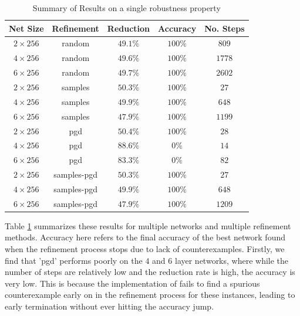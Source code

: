 \begin{table}
\begin{tabular}{|c|c|c|c|c|}
    \hline
    Net Size     & Refinement  & Reduction & Accuracy & No. Steps \\
    \hline
    $2\times256$ & random      & $49.1\%$  & $100\%$  & $ 809$    \\
    $4\times256$ & random      & $49.6\%$  & $100\%$  & $1778$    \\
    $6\times256$ & random      & $49.7\%$  & $100\%$  & $2602$    \\
    $2\times256$ & samples     & $50.3\%$  & $100\%$  & $  27$    \\
    $4\times256$ & samples     & $49.9\%$  & $100\%$  & $ 648$    \\
    $6\times256$ & samples     & $47.9\%$  & $100\%$  & $1199$    \\
    $2\times256$ & pgd         & $50.4\%$  & $100\%$  & $  28$    \\
    $4\times256$ & pgd         & $88.6\%$  & $  0\%$  & $  14$    \\
    $6\times256$ & pgd         & $83.3\%$  & $  0\%$  & $  82$    \\
    $2\times256$ & samples-pgd & $50.3\%$  & $100\%$  & $  27$    \\
    $4\times256$ & samples-pgd & $49.9\%$  & $100\%$  & $ 648$    \\
    $6\times256$ & samples-pgd & $47.9\%$  & $100\%$  & $1209$    \\
    \hline
\end{tabular}
\caption{Summary of \mnist Results on a single robustness property }
\label{t:mnist-prop-summary}
\end{table}

Table \ref{t:mnist-prop-summary} summarizes these results for multiple \mnist
networks and multiple refinement methods. Accuracy here refers to the final
accuracy of the best network found when the refinement process stops due to lack
of counterexamples. Firstly, we find that 'pgd' performs poorly on the $4$ and
$6$ layer networks, where while the number of steps are relatively low and the
reduction rate is high, the accuracy is very low. This is because the \abcrown
implementation of \pgd fails to find a spurious counterexample early on in the
refinement process for these instances, leading to early termination without
ever hitting the accuracy jump. 

